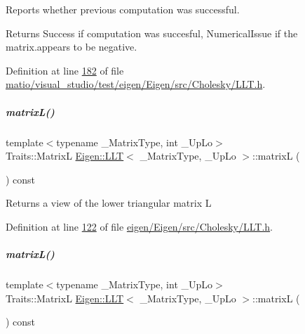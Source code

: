 Reports whether previous computation was successful. 

\begin{DoxyReturn}{Returns}
{\ttfamily Success} if computation was succesful, {\ttfamily Numerical\+Issue} if the matrix.\+appears to be negative. 
\end{DoxyReturn}


Definition at line \hyperlink{matio_2visual__studio_2test_2eigen_2_eigen_2src_2_cholesky_2_l_l_t_8h_source_l00182}{182} of file \hyperlink{matio_2visual__studio_2test_2eigen_2_eigen_2src_2_cholesky_2_l_l_t_8h_source}{matio/visual\+\_\+studio/test/eigen/\+Eigen/src/\+Cholesky/\+L\+L\+T.\+h}.

\mbox{\label{group___cholesky___module_a7f4a3eedbf82e7ce2d6bf0dcd84cdfa3}} 
\subparagraph{\texorpdfstring{matrix\+L()}{matrixL()}\hspace{0.1cm}{\footnotesize\ttfamily [1/2]}}
{\footnotesize\ttfamily template$<$typename \+\_\+\+Matrix\+Type, int \+\_\+\+Up\+Lo$>$ \\
Traits\+::\+MatrixL \hyperlink{group___cholesky___module_class_eigen_1_1_l_l_t}{Eigen\+::\+L\+LT}$<$ \+\_\+\+Matrix\+Type, \+\_\+\+Up\+Lo $>$\+::matrixL (\begin{DoxyParamCaption}{ }\end{DoxyParamCaption}) const\hspace{0.3cm}{\ttfamily [inline]}}

\begin{DoxyReturn}{Returns}
a view of the lower triangular matrix L 
\end{DoxyReturn}


Definition at line \hyperlink{eigen_2_eigen_2src_2_cholesky_2_l_l_t_8h_source_l00122}{122} of file \hyperlink{eigen_2_eigen_2src_2_cholesky_2_l_l_t_8h_source}{eigen/\+Eigen/src/\+Cholesky/\+L\+L\+T.\+h}.

\mbox{\label{group___cholesky___module_a7f4a3eedbf82e7ce2d6bf0dcd84cdfa3}} 
\subparagraph{\texorpdfstring{matrix\+L()}{matrixL()}\hspace{0.1cm}{\footnotesize\ttfamily [2/2]}}
{\footnotesize\ttfamily template$<$typename \+\_\+\+Matrix\+Type, int \+\_\+\+Up\+Lo$>$ \\
Traits\+::\+MatrixL \hyperlink{group___cholesky___module_class_eigen_1_1_l_l_t}{Eigen\+::\+L\+LT}$<$ \+\_\+\+Matrix\+Type, \+\_\+\+Up\+Lo $>$\+::matrixL (\begin{DoxyParamCaption}{ }\end{DoxyParamCaption}) const\hspace{0.3cm}{\ttfamily [inline]}}


